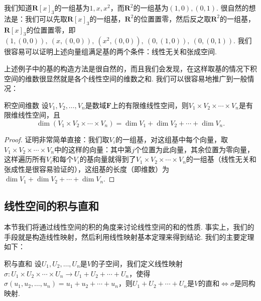 \begin{solution}
    我们知道$\mathbf{R}[x]_3$的一组基为$1,x,x^2$，而$\mathbf{R}^2$的一组基为$(1,0),(0,1)$. 很自然的想法是：我们可以先取$\mathbf{R}[x]_3$的一组基，$\mathbf{R}^2$的位置置零，然后反之取$\mathbf{R}^2$的一组基，$\mathbf{R}[x]_3$的位置置零，即$(1,(0,0)),\ (x,(0,0)),\ (x^2,(0,0)),\ (0,(1,0)),\ (0,(0,1))$. 我们很容易可以证明上述向量组满足基的两个条件：线性无关和张成空间.
\end{solution}

上述例子中的基的构造方法是很自然的，而且我们会发现，在这样取基的情况下积空间的维数很显然就是各个线性空间的维数之和. 我们可以很容易地推广到一般情况：
\begin{theorem}{}{积空间维数}
    设$V_1,V_2,\ldots,V_n$是数域$\mathbf{F}$上的有限维线性空间，则$V_1 \times V_2 \times \cdots \times V_n$是有限维线性空间，且
    \[\dim(V_1 \times V_2 \times \cdots \times V_n)=\dim V_1+\dim V_2+\cdots+\dim V_n.\]
\end{theorem}

\begin{proof}
    证明非常简单直接：我们取$V_i$的一组基，对这组基中每个向量，取$V_1 \times V_2 \times \cdots \times V_n$中的这样的向量：其中第$j$个位置为此向量，其余位置为零向量，这样遍历所有$V_i$和每个$V_i$的基向量就得到了$V_1 \times V_2 \times \cdots \times V_n$的一组基（线性无关和张成性是很容易验证的），这组基的长度（即维数）为$\dim V_1+\dim V_2+\cdots+\dim V_n$.
\end{proof}

\subsection{线性空间的积与直和}

本节我们将通过线性空间的积的角度来讨论线性空间的和的性质. 事实上，我们的手段就是构造线性映射，然后利用线性映射基本定理来得到结论. 我们的主要定理如下：
\begin{theorem}{}{积与直和}
    设$U_1,U_2,\ldots,U_n$是$V$的子空间，我们定义线性映射$\sigma:U_1 \times U_2 \times \cdots \times U_n \to U_1+U_2+\cdots+U_n$，使得$\sigma(u_1,u_2,\ldots,u_n)=u_1+u_2+\cdots+u_n$，则$U_1+U_2+\cdots+U_n$是$V$的直和$\iff \sigma$是同构映射.
\end{theorem}

